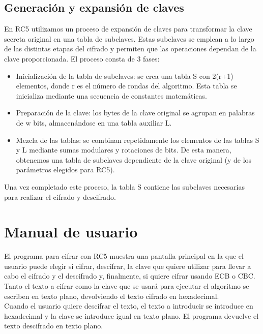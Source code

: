 \documentclass[12pt,a4paper]{article}
\begin{document}
	\subsection{Generación y expansión de claves}
	En RC5 utilizamos un proceso de expansión de claves para transformar la clave secreta original en una tabla de subclaves. Estas subclaves se emplean a lo largo de las distintas etapas del cifrado y permiten que las operaciones dependan de la clave proporcionada.
	El proceso consta de 3 fases:
	\begin{itemize}
		\item Inicialización de la tabla de subclaves: se crea una tabla S con 2(r+1) elementos, donde r es el número de rondas del algoritmo. Esta tabla se inicializa mediante una secuencia de constantes matemáticas.
		\item Preparación de la clave: los bytes de la clave original se agrupan en palabras de w bits, almacenándose en una tabla auxiliar L.
		\item Mezcla de las tablas: se combinan repetidamente los elementos de las tablas S y L mediante sumas modulares y rotaciones de bits. De esta manera, obtenemos una tabla de subclaves dependiente de la clave original (y de los parámetros elegidos para RC5).
	\end{itemize}
	Una vez completado este proceso, la tabla S contiene las subclaves necesarias para realizar el cifrado y descifrado. 
	

	
	
	\section{Manual de usuario}
	El programa para cifrar con RC5 muestra una pantalla principal en la que el usuario puede elegir si cifrar, descifrar, la clave que quiere utilizar para llevar a cabo el cifrado y el descifrado y, finalmente, si quiere cifrar usando ECB o CBC. \\
	
	Tanto el texto a cifrar como la clave que se usará para ejecutar el algoritmo se escriben en texto plano, devolviendo el texto cifrado en hexadecimal. \\
	
	Cuando el usuario quiere descifrar el texto, el texto a introducir se introduce en hexadecimal y la clave se introduce igual en texto plano. El programa devuelve el texto descifrado en texto plano.\\
	
\end{document}
